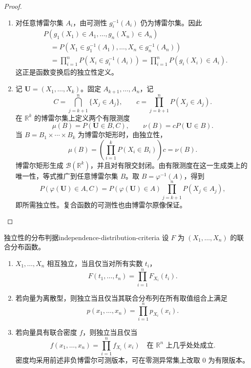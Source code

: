 \begin{proof}
\begin{enumerate}
\item 对任意博雷尔集 $A_i$，由可测性 $g_i^{-1}(A_i)$ 仍为博雷尔集。因此
\begin{align*}
&P(g_1(X_1)\in A_1,\ldots,g_n(X_n)\in A_n)\\
&\quad=P(X_1\in g_1^{-1}(A_1),\ldots,X_n\in g_n^{-1}(A_n))\\
&\quad=\prod_{i=1}^nP(X_i\in g_i^{-1}(A_i))
=\prod_{i=1}^nP(g_i(X_i)\in A_i).
\end{align*}
这正是函数变换后的独立性定义。
\item
记 $\boldsymbol U=(X_1,\ldots,X_k)$。固定 $A_{k+1},\ldots,A_n$，记
\[
C=\bigcap_{j=k+1}^n\{X_j\in A_j\},\qquad
c=\prod_{j=k+1}^nP(X_j\in A_j).
\]
在 $\mathbb R^k$ 的博雷尔集上定义两个有限测度
\[
\mu(B)=P(\boldsymbol U\in B,C),\qquad
\nu(B)=cP(\boldsymbol U\in B).
\]
当 $B=B_1\times\cdots\times B_k$ 为博雷尔矩形时，由独立性，
\[
\mu(B)=\left(\prod_{i=1}^kP(X_i\in B_i)\right)c=\nu(B).
\]
博雷尔矩形生成 $\mathcal B(\mathbb R^k)$，并且对有限交封闭。由有限测度在这一生成类上的唯一性，等式推广到任意博雷尔集 $B$。取 $B=\varphi^{-1}(A)$，得到
\[
P(\varphi(\boldsymbol U)\in A,C)
=P(\varphi(\boldsymbol U)\in A)\prod_{j=k+1}^nP(X_j\in A_j),
\]
即所需独立性。复合函数的可测性也由博雷尔原像保证。
\end{enumerate}
\end{proof}

\begin{mytheorem}{独立性的分布判据}{independence-distribution-criteria}
设 $F$ 为 $(X_1,\ldots,X_n)$ 的联合分布函数。
\begin{enumerate}
\item $X_1,\ldots,X_n$ 相互独立，当且仅当对所有实数 $t_i$，
\[
F(t_1,\ldots,t_n)=\prod_{i=1}^nF_{X_i}(t_i).
\]
\item 若向量为离散型，则独立当且仅当其联合分布列在所有取值组合上满足
\[
p(x_1,\ldots,x_n)=\prod_{i=1}^np_{X_i}(x_i).
\]
\item 若向量具有联合密度 $f$，则独立当且仅当
\[
f(x_1,\ldots,x_n)=\prod_{i=1}^nf_{X_i}(x_i)
\quad\text{在 }\mathbb R^n\text{ 上几乎处处成立}.
\]
密度均采用前述非负博雷尔可测版本，可在零测异常集上改取 $0$ 为有限版本。
\end{enumerate}
\end{mytheorem}

